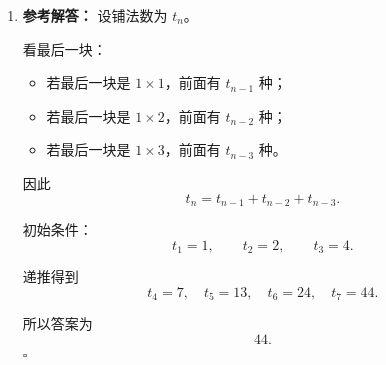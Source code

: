 \documentclass[11pt,a4paper,fontset=fandol]{ctexart}
\newenvironment{solution}{\par\noindent\textbf{参考解答：}}{\hfill$\square$\par}
\begin{document}
\begin{enumerate}
  \item \begin{solution}
  设铺法数为 $t_n$。

  看最后一块：
  \begin{itemize}
    \item 若最后一块是 $1\times 1$，前面有 $t_{n-1}$ 种；
    \item 若最后一块是 $1\times 2$，前面有 $t_{n-2}$ 种；
    \item 若最后一块是 $1\times 3$，前面有 $t_{n-3}$ 种。
  \end{itemize}

  因此
  \[
  t_n=t_{n-1}+t_{n-2}+t_{n-3}.
  \]

  初始条件：
  \[
  t_1=1,\qquad t_2=2,\qquad t_3=4.
  \]

  递推得到
  \[
  t_4=7,\quad t_5=13,\quad t_6=24,\quad t_7=44.
  \]

  所以答案为
  \[
  44.
  \]
  \end{solution}
\end{enumerate}
\end{document}
